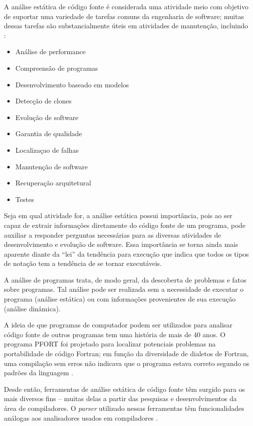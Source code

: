 A análise estática de código fonte é considerada uma atividade meio com
objetivo de suportar uma variedade de tarefas comuns da engenharia de
software; muitas dessas tarefas são substancialmente úteis em atividades de
manutenção, incluindo \cite{binkley2007source}:

\begin{multicols}{2}
  \begin{itemize}
    \item Análise de performance
    \item Compreensão de programas
    \item Desenvolvimento baseado em modelos
    \item Detecção de clones
    \item Evolução de software
    \item Garantia de qualidade
    \item Localizaçao de falhas
    \item Manutenção de software
    \item Recuperação arquitetural
    \item Testes
  \end{itemize}
\end{multicols}

Seja em qual atividade for, a análise estática possui importância,
pois ao ser capaz de extrair informações diretamente do
código fonte de um programa, pode auxiliar a responder perguntas necessárias
para as diversas atividades de desenvolvimento e evolução de software. Essa
importância se torna ainda mais aparente diante da ``lei'' da tendência para
execução \cite{harman2010why} que indica que todos os tipos de notação tem a
tendência de se tornar executáveis.

A análise de programas trata, de modo geral, da descoberta de problemas e
fatos sobre programas. Tal análise pode ser realizada sem a necessidade de executar o
programa (análise estática) ou com informações provenientes de sua execução
(análise dinâmica).

A ideia de que programas de computador podem ser utilizados para analisar
código fonte de outros programas tem uma história de mais de 40 anos.  O
programa PFORT \cite{ryder1974pfort} foi projetado para localizar potenciais
problemas na portabilidade de código Fortran; em função da diversidade de
dialetos de Fortran, uma compilação sem erros não indicava que o programa
estava correto segundo os padrões da linguagem \cite{wichmann1995industrial}.

Desde então, ferramentas de análise estática de código fonte têm surgido para
os mais diversos fins -- muitas delas a partir das pesquisas e
desenvolvimentos da área de compiladores.  O {\it parser} utilizado nessas
ferramentas têm funcionalidades análogas aos analisadores usados em
compiladores \cite{anderson2008the}.

